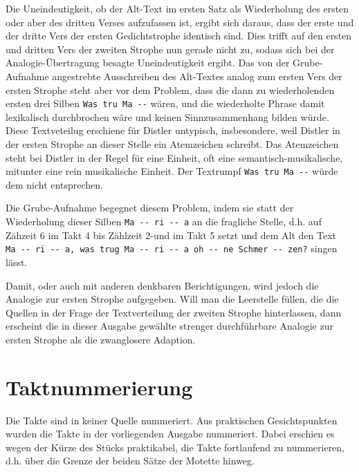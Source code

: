 \documentclass{article}
\begin{document}
\begin{multicols}{2}
Die Uneindeutigkeit, ob der Alt-Text im ersten Satz als Wiederholung des
ersten oder aber des dritten Verses aufzufassen ist, ergibt sich daraus,
dass der erste und der dritte Vers der ersten Gedichtstrophe identisch
sind. Dies trifft auf den ersten und dritten Vers der zweiten Strophe
nun gerade nicht zu, sodass sich bei der Analogie-Übertragung besagte
Uneindeutigkeit ergibt. Das von der Grube-Aufnahme angestrebte
Ausschreiben des Alt-Textes analog zum ersten Vers der ersten Strophe
steht aber vor dem Problem, dass die dann zu wiederholenden ersten drei
Silben \texttt{Was\ tru\ Ma\ -\/-} wären, und die wiederholte Phrase
damit lexikalisch durchbrochen wäre und keinen Sinnzusammenhang bilden
würde. Diese Textveteilug erschiene für Distler untypisch, insbesondere,
weil Distler in der ersten Strophe an dieser Stelle ein Atemzeichen
schreibt. Das Atemzeichen steht bei Distler in der Regel für eine
Einheit, oft eine semantisch-musikalische, mitunter eine rein
musikalische Einheit. Der Textrumpf \texttt{Was\ tru\ Ma\ -\/-} würde
dem nicht entsprechen.

Die Grube-Aufnahme begegnet diesem Problem, indem sie statt der
Wiederholung dieser Silben \texttt{Ma\ -\/-\ ri\ -\/-\ a} an die
fragliche Stelle, d.h. auf Zähzeit 6 im Takt 4 bis Zählzeit 2-und im
Takt 5 setzt und dem Alt den Text
\texttt{Ma\ -\/-\ ri\ -\/-\ a,\ was\ trug\ Ma\ -\/-\ ri\ -\/-\ a\ oh\ -\/-\ ne\ Schmer\ -\/-\ zen?}
singen lässt.

Damit, oder auch mit anderen denkbaren Berichtigungen, wird jedoch die
Analogie zur ersten Strophe aufgegeben. Will man die Leerstelle füllen,
die die Quellen in der Frage der Textverteilung der zweiten Strophe
hinterlassen, dann erscheint die in dieser Ausgabe gewählte strenger
durchführbare Analogie zur ersten Strophe als die zwanglosere Adaption.

\section{Taktnummerierung}

Die Takte sind in keiner Quelle nummeriert. Aus praktischen
Gesichtspunkten wurden die Takte in der vorliegenden Ausgabe nummeriert.
Dabei erschien es wegen der Kürze des Stücks praktikabel, die Takte
fortlaufend zu nummerieren, d.h. über die Grenze der beiden Sätze der
Motette hinweg.

\end{multicols}
\end{document}
